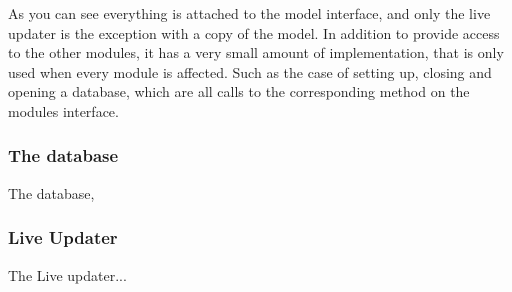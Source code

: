 As you can see everything is attached to the model interface, and only the live updater is the exception with a copy of the model. In addition to provide access to the other modules, it has a very small amount of implementation, that is only used when every module is affected. Such as the case of setting up, closing and opening a database, which are all calls to the corresponding method on the modules interface. 

\subsubsection{The database}
\label{subsubsec:databse_imp}

The database, 

\subsubsection{Live Updater}
\label{subsubsec:Live Updater}

The Live updater...